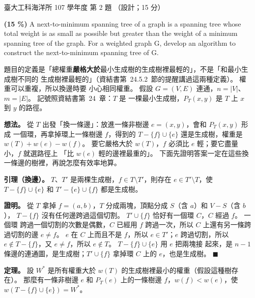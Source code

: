 \begin{pastexam}[label={px:ntu-107-esoe-ds-02}]{臺大工科海洋所 107 學年度 第 2 題}
（設計；15 分）

\textbf{(15 \%)} A next-to-minimum spanning tree of a graph is a spanning tree whose total weight is
as small as possible but greater than the weight of a minimum spanning tree of the graph. For a
weighted graph G, develop an algorithm to construct the next-to-minimum spanning tree of G.
\end{pastexam}

\begin{pastsoln}
題目的定義是「總權重\textbf{嚴格大於}最小生成樹的生成樹裡最輕的」，不是「和最小生成樹不同的
生成樹裡最輕的」（資結書第~24.5.2~節的提醒講過這兩種定義）。 權重可以重複，所以換邊時要
小心相同權重。 假設 $G = (V, E)$ 連通，$n = |V|$、$m = |E|$。 記號照資結書第~24~章：$T$ 是
一棵最小生成樹，$P_T(x, y)$ 是 $T$ 上 $x$ 到 $y$ 的路徑。

\textbf{想法。} 從 $T$ 出發「換一條邊」：放進一條非樹邊 $e = (x, y)$，會和 $P_T(x, y)$ 形成
一個環，再拿掉環上一條樹邊 $f$，得到的 $T - \{f\} \cup \{e\}$ 還是生成樹，權重是
$w(T) + w(e) - w(f)$。 要它嚴格大於 $w(T)$，$f$ 必須比 $e$ 輕；要它盡量小，$f$ 就選路徑上
「比 $w(e)$ 輕的邊裡最重的」。 下面先證明答案一定在這些換一條邊的樹裡，再說怎麼有效率地算。

\textbf{引理（換邊）。} $T$、$T'$ 是兩棵生成樹，$f \in T \setminus T'$，則存在
$e \in T' \setminus T$，使 $T - \{f\} \cup \{e\}$ 和 $T' - \{e\} \cup \{f\}$ 都是生成樹。

\textbf{證明。} 從 $T$ 拿掉 $f = (a, b)$，$T$ 分成兩塊，頂點分成 $S$（含 $a$）和 $V - S$（含 $b$），
$T - \{f\}$ 沒有任何邊跨過這個切割。 $T' \cup \{f\}$ 恰好有一個環 $C$，$C$ 經過 $f$。 一個環
跨過一個切割的次數是偶數，$C$ 已經用 $f$ 跨過一次，所以 $C$ 上還有另一條跨過切割的邊
$e \ne f$。 $e$ 在 $C$ 上而且不是 $f$，所以 $e \in T'$；$e$ 跨過切割，所以
$e \notin T - \{f\}$，又 $e \ne f$，所以 $e \notin T$。 $T - \{f\} \cup \{e\}$ 用 $e$ 把兩塊接
起來，是 $n - 1$ 條邊的連通圖，是生成樹；$T' \cup \{f\}$ 拿掉環 $C$ 上的 $e$，也是生成樹。
\hfill$\blacksquare$

\textbf{定理。} 設 $W^{*}$ 是所有權重大於 $w(T)$ 的生成樹裡最小的權重（假設這種樹存在）。
那麼有一條非樹邊 $e$ 和 $P_T(e)$ 上的一條樹邊 $f$，$w(f) < w(e)$，使
$w(T - \{f\} \cup \{e\}) = W^{*}$。


\end{pastsoln}
